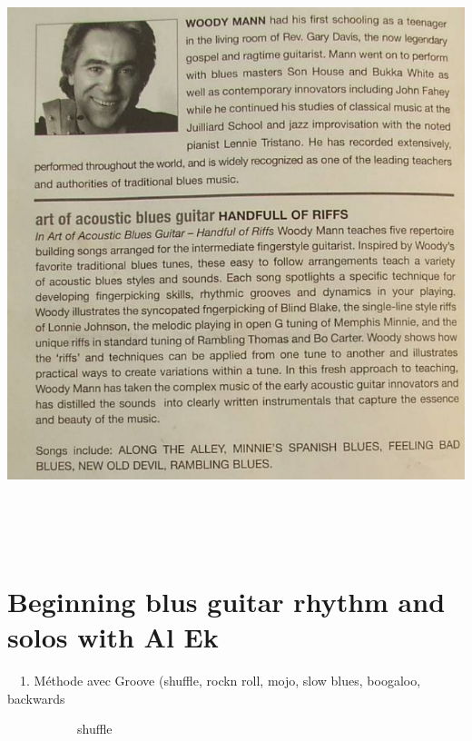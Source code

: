 \documentclass[a4paper]{book}
\begin{document}
\clearpage

\begin{center}
\includegraphics[width=17cm,height=17.552cm]{lebluessupportsmethodes-img49.png}
\end{center}




\clearpage\section[Beginning blus guitar rhythm and solos with Al
Ek]{Beginning blus guitar rhythm and solos with Al Ek}
\hypertarget{RefHeadingToc114973218262}{}\ \ 1. M\'ethode avec Groove
(shuffle, rock{\textquotesingle}n roll, mojo, slow blues, boogaloo,
backwards

\ \ \ \ \ \ \ \ \ \ \ shuffle
\end{document}
